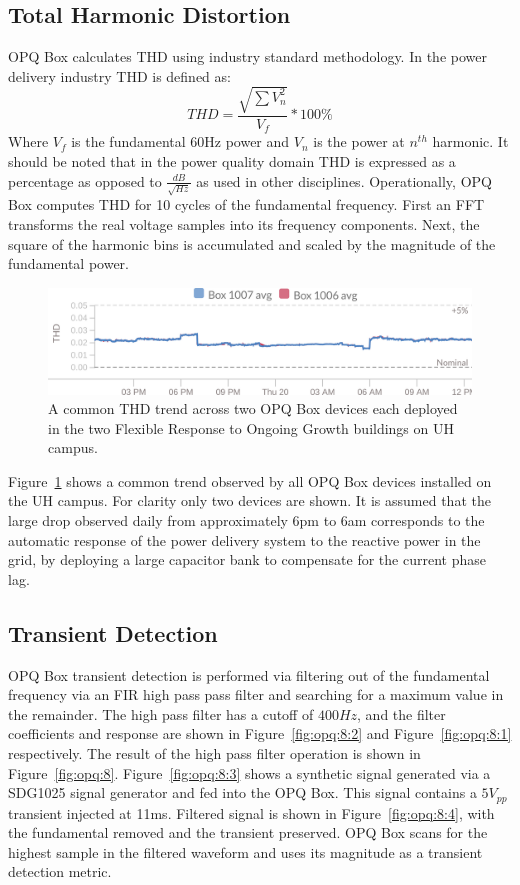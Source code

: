 \subsection{Total Harmonic Distortion}\label{subsec:thd}
OPQ Box calculates THD using industry standard methodology.
In the power delivery industry THD is defined as:
\begin{equation} \label{eq:4}
THD = \frac{\sqrt{\sum{V_{n}^2}}}{V_{f}}*100\%
\end{equation}
Where $V_{f}$ is the fundamental 60Hz power and $V_{n}$ is the power at $n^{th}$ harmonic.
It should be noted that in the power quality domain THD is expressed as a percentage as opposed to $\frac{dB}{\sqrt{Hz}}$ as used in other disciplines.
Operationally, OPQ Box computes THD for 10 cycles of the fundamental frequency.
First an FFT transforms the real voltage samples into its frequency components.
Next, the square of the harmonic bins is accumulated and scaled by the magnitude of the fundamental power.

\begin{figure}[h]
	\centering
	\includegraphics[width=1\linewidth]{img/thd_two_devices_24_hours.png}
	\caption{A common THD trend across two OPQ Box devices each deployed in the two Flexible Response to Ongoing Growth buildings on UH campus.}
	\label{fig:opq:7}
\end{figure}

Figure~\ref{fig:opq:7} shows a common trend observed by all OPQ Box devices installed on the UH campus.
For clarity only two devices are shown.
It is assumed that the large drop observed daily from approximately 6pm to 6am corresponds to the automatic response of the power delivery system to the reactive power in the grid, by deploying a large capacitor bank to compensate for the current phase lag.

\subsection{Transient Detection}\label{subsec:transient-detection}

OPQ Box transient detection is performed via filtering out of the fundamental frequency via an FIR high pass pass filter and searching for a maximum value in the remainder.
The high pass filter has a cutoff of $400Hz$, and the filter coefficients and response are shown in Figure~\ref{fig:opq:8:2} and Figure~\ref{fig:opq:8:1} respectively.
The result of the high pass filter operation is shown in Figure~\ref{fig:opq:8}.
Figure~\ref{fig:opq:8:3} shows a synthetic signal generated via a SDG1025 signal generator and fed into the OPQ Box.
This signal contains a $5V_{pp}$ transient injected at 11ms.
Filtered signal is shown in Figure~\ref{fig:opq:8:4}, with the fundamental removed and the transient preserved.
OPQ Box scans for the highest sample in the filtered waveform and uses its magnitude as a transient detection metric.


